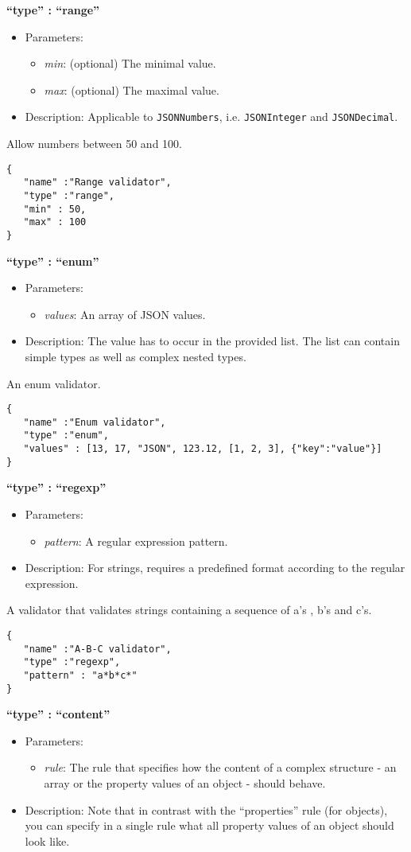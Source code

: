 \documentclass[a4paper]{article}
\newcommand{\ruledef}[3]{
\medskip
\textbf{#1}

\begin{itemize}
\setlength{\itemsep}{1pt}
\setlength{\parskip}{0pt}
\setlength{\parsep}{0pt}
   \item Parameters: #2
   \item Description: #3
\end{itemize}
}
\newcommand{\rulename}[1]{\textbf{``type'' : ``#1''}}
\newcommand{\param}[1]{\textsl{#1}:}
\begin{document}
\ruledef{\rulename{range}}{\begin{itemize} \item \param{min} (optional) The minimal value.\item \param{max} (optional) The maximal value.\end{itemize}}{Applicable to \lstinline{JSONNumbers}, i.e. \lstinline{JSONInteger} and \lstinline{JSONDecimal}.}

Allow numbers between 50 and 100.
\begin{lstlisting}
{
   "name" :"Range validator",
   "type" :"range",
   "min" : 50,
   "max" : 100
}
\end{lstlisting}

\ruledef{\rulename{enum}}{\begin{itemize} \item \param{values} An array of JSON values. \end{itemize}}{The value has to occur in the provided list. The list can contain simple types as well as complex nested types.}

An enum validator.
\begin{lstlisting}
{
   "name" :"Enum validator",
   "type" :"enum",
   "values" : [13, 17, "JSON", 123.12, [1, 2, 3], {"key":"value"}]
}
\end{lstlisting}

\ruledef{\rulename{regexp}}{\begin{itemize} \item \param{pattern} A regular expression pattern.\end{itemize}}{For strings, requires a predefined format according to the regular expression.}

A validator that validates strings containing a sequence of a's , b's and c's.

\begin{lstlisting}
{
   "name" :"A-B-C validator",
   "type" :"regexp",
   "pattern" : "a*b*c*"
}
\end{lstlisting}

\ruledef{\rulename{content}}{\begin{itemize} \item \param{rule} The rule that specifies how the content of a complex structure -  an array or the property values of an object -  should behave. \end{itemize}}{ Note that in contrast with the ``properties'' rule (for objects), you can specify in a single rule what all property values of an object should look like.}
\end{document}
